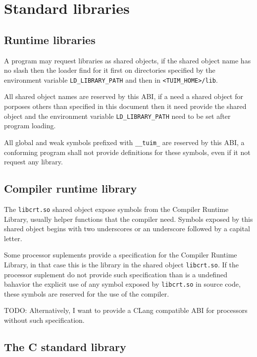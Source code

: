\chapter{Standard libraries}

\section{Runtime libraries}

A program may request libraries as shared objects,
if the shared object name has no slash then the loader find for it
first on directories specified by the environment variable
\texttt{LD\_LIBRARY\_PATH} and then in \texttt{<TUIM\_HOME>/lib}.

All shared object names are reserved by this ABI,
if a  need a shared object for porposes others than
specified in this document then it need provide the shared object and
the environment variable \texttt{LD\_LIBRARY\_PATH} need to be set
after program loading.

All global and weak symbols prefixed with \texttt{\_\_tuim\_}
are reserved by this ABI,
a conforming program shall not provide definitions for these symbols,
even if it not request any library.

\section{Compiler runtime library}

The \texttt{libcrt.so} shared object
expose symbols from the Compiler Runtime Library,
usually helper functions that the compiler need.
Symbols exposed by this shared object
begins with two underscores or an underscore followed by a capital letter.

Some processor suplements provide a specification for the
Compiler Runtime Library, in that case this is the library in the shared
object \texttt{libcrt.so}.
If the processor suplement do not provide such specification than
is a undefined bahavior the explicit use of
any symbol exposed by \texttt{libcrt.so} in source code,
these symbols are reserved for the use of the compiler.

TODO: Alternatively, I want to provide a CLang compatible ABI for processors
without such specification.

\section{The C standard library}

